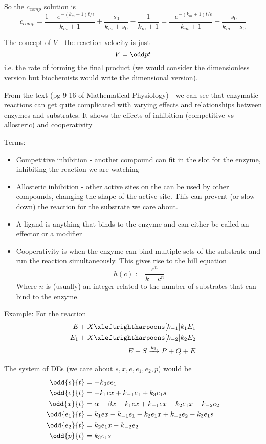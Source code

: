 \documentclass{X:/Documents/Coding/Latex/myassignment}
\begin{document}
So the $c_{comp}$ solution is
\[c_{comp} = \frac{1-e^{-\left(k_m+1\right)t/\epsilon}}{k_m+1} +\frac{s_0}{k_m + s_0} - \frac{1}{k_m +1} = \frac{-e^{-\left(k_m+1\right)t/\epsilon}}{k_m+1} +\frac{s_0}{k_m + s_0} \]


The concept of $V$ - the reaction velocity is just
\[V = \odd pt\]
i.e. the rate of forming the final product (we would consider the dimensionless version but biochemists would write the dimensional version).


From the text (pg 9-16 of Mathematical Physiology) - we can see that enzymatic reactions can get quite complicated with varying effects and relationships between enzymes and substrates. It shows the effects of inhibition (competitive vs allosteric) and cooperativity

Terms:
\begin{itemize}
	\item Competitive inhibition - another compound can fit in the slot for the enzyme, inhibiting the reaction we are watching 
	\item Allosteric inhibition - other active sites on the can be used by other compounds, changing the shape of the active site. This can prevent (or slow down) the reaction for the substrate we care about.
	\item A ligand is anything that binds to the enzyme and can either be called an effector or a modifier
	\item Cooperativity is when the enzyme can bind multiple sets of the substrate and run the reaction simultaneously. This gives rise to the hill equation
	\[h(c) :=\frac{c^n}{k + c^n}\]
	Where $n$ is (usually) an integer related to the number of substrates that can bind to the enzyme.
\end{itemize}


Example:
For the reaction
\begin{align*}
	E + X \xleftrightharpoons[k_{-1}]{k_1} E_1\\
	E_1 + X \xleftrightharpoons[k_{-2}]{k_2} E_2\\
	E + S \xrightarrow{k_3} P + Q + E
\end{align*}

The system of DEs (we care about $s, x, e, e_1, e_2, p$) would be
\begin{align*}
	\odd{s}{t} &= -k_3 se_1\\
 	\odd{e}{t} &=  - k_1 ex + k_{-1} e_1 + k_3 e_1s\\
 	\odd{x}{t} &= \alpha - \beta x - k_1 e x + k_{-1}e x - k_2 e_1 x + k_{-2} e_2\\
 	\odd{e_1}{t} &= k_1 e x - k_{-1} e_1 - k_2 e_1 x + k_{-2} e_2 - k_3 e_1 s\\
 	\odd{e_2}{t} &= k_2 e_1 x - k_{-2} e_2\\ 
 	\odd{p}{t} &= k_3 e_1 s
 \end{align*} 
\end{document}
